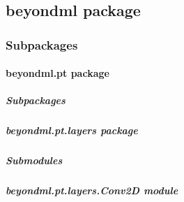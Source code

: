\documentclass[letterpaper,10pt,english]{sphinxmanual}
\begin{document}
\subsection{beyondml package}
\label{\detokenize{beyondml:beyondml-package}}\label{\detokenize{beyondml::doc}}

\subsubsection{Subpackages}
\label{\detokenize{beyondml:subpackages}}
\sphinxstepscope


\paragraph{beyondml.pt package}
\label{\detokenize{beyondml.pt:beyondml-pt-package}}\label{\detokenize{beyondml.pt::doc}}

\subparagraph{Subpackages}
\label{\detokenize{beyondml.pt:subpackages}}
\sphinxstepscope


\subparagraph{beyondml.pt.layers package}
\label{\detokenize{beyondml.pt.layers:beyondml-pt-layers-package}}\label{\detokenize{beyondml.pt.layers::doc}}

\subparagraph{Submodules}
\label{\detokenize{beyondml.pt.layers:submodules}}

\subparagraph{beyondml.pt.layers.Conv2D module}
\label{\detokenize{beyondml.pt.layers:module-beyondml.pt.layers.Conv2D}}\label{\detokenize{beyondml.pt.layers:beyondml-pt-layers-conv2d-module}}
\end{document}
